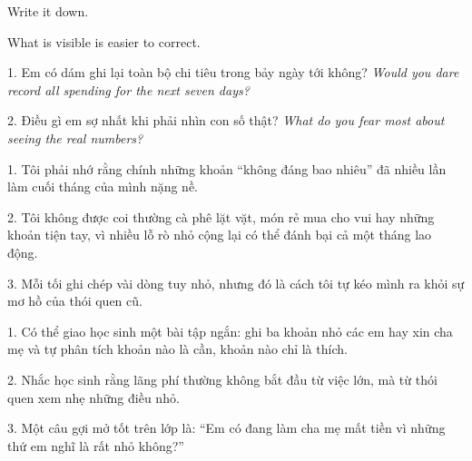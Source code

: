 \begin{ghinhoanh}
Write it down.

What is visible is easier to correct.
\end{ghinhoanh}

\begin{tuhocnhanh}
1. Em có dám ghi lại toàn bộ chi tiêu trong bảy ngày tới không? \textit{Would you dare record all spending for the next seven days?}

2. Điều gì em sợ nhất khi phải nhìn con số thật? \textit{What do you fear most about seeing the real numbers?}
\end{tuhocnhanh}

\begin{turanminh}
1. Tôi phải nhớ rằng chính những khoản ``không đáng bao nhiêu'' đã nhiều lần làm cuối tháng của mình nặng nề.

2. Tôi không được coi thường cà phê lặt vặt, món rẻ mua cho vui hay những khoản tiện tay, vì nhiều lỗ rò nhỏ cộng lại có thể đánh bại cả một tháng lao động.

3. Mỗi tối ghi chép vài dòng tuy nhỏ, nhưng đó là cách tôi tự kéo mình ra khỏi sự mơ hồ của thói quen cũ.
\end{turanminh}

\begin{dayhoc}
1. Có thể giao học sinh một bài tập ngắn: ghi ba khoản nhỏ các em hay xin cha mẹ và tự phân tích khoản nào là cần, khoản nào chỉ là thích.

2. Nhắc học sinh rằng lãng phí thường không bắt đầu từ việc lớn, mà từ thói quen xem nhẹ những điều nhỏ.

3. Một câu gợi mở tốt trên lớp là: ``Em có đang làm cha mẹ mất tiền vì những thứ em nghĩ là rất nhỏ không?''
\end{dayhoc}